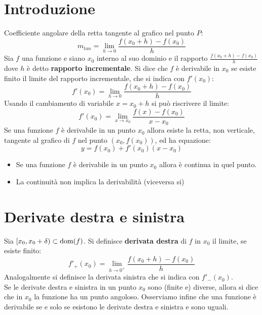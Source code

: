 \documentclass[12pt, a4paper]{report}
\begin{document}
    \section{Introduzione}
    Coefficiente angolare della retta tangente al grafico nel punto $P$:
    \begin{equation*}
        m_{tan}=\lim_{h\to 0}\frac{f(x_{0}+h)-f(x_{0})}{h}
    \end{equation*}
    Sia $f$ una funzione e siano $x_{0}$ interno al suo dominio e il rapporto $\frac{f(x_{0}+h)-f(x_{0})}{h}$ dove $h$ è detto \textbf{rapporto incrementale}. Si dice che $f$ è derivabile in $x_{0}$ se esiste finito il limite del rapporto incrementale, che si indica con $f'(x_{0})$:
    \begin{equation*}
        f'(x_{0})=\lim_{h\to 0}\frac{f(x_{0}+h)-f(x_{0})}{h}
    \end{equation*}
    Usando il cambiamento di variabile $x=x_{0}+h$ si può riscrivere il limite:
    \begin{equation*}
        f'(x_{0})=\lim_{x\to x_{0}}\frac{f(x)-f(x_{0})}{x-x_{0}}
    \end{equation*}
    Se una funzione $f$ è derivabile in un punto $x_{0}$ allora esiste la retta, non verticale, tangente al grafico di $f$ nel punto $(x_{0},f(x_{0}))$, ed ha equazione:
    \begin{equation*}
        y = f(x_{0})+f'(x_{0})(x-x_{0})
    \end{equation*}
    \begin{itemize}
        \item Se una funzione $f$ è derivabile in un punto $x_{0}$ allora è continua in quel punto.
        \item La continuità non implica la derivabilità (viceversa si)
    \end{itemize}
    \section{Derivate destra e sinistra}
    Sia $[x_{0},x_{0}+\delta)\subset \text{dom}(f)$. Si definisce \textbf{derivata destra} di $f$ in $x_{0}$ il limite, se esiste finito:
    \begin{equation*}
        f'_{+}(x_{0})=\lim_{h\to 0^{+}}\frac{f(x_{0}+h)-f(x_{0})}{h}
    \end{equation*}
    Analogalmente si definisce la derivata sinistra che si indica con $f'_{-}(x_{0})$.\\
    Se le derivate destra e sinistra in un punto $x_{0}$ sono (finite e) diverse, allora si dice che in $x_{0}$ la funzione ha un punto angoloso. Osserviamo infine che una funzione è derivabile se e solo se esistono le derivate destra e sinistra e sono uguali.
\end{document}
